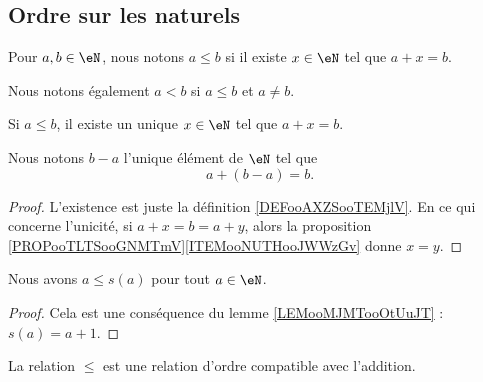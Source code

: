 \subsection{Ordre sur les naturels}
\label{SUBooOrdreNaturels}

\begin{definition}     \label{DEFooAXZSooTEMjlV}
	Pour \( a,b\in \eN\), nous notons \( a\leq b\) si il existe \( x\in \eN\) tel que \( a+x=b\).

	Nous notons également \( a<b \) si \( a\leq b\) et \( a\neq b\).
\end{definition}

\begin{propositionDef}	\label{LEMooVOTAooALatDu}
	Si \( a\leq b\), il existe un unique \( x\in \eN\) tel que \( a+x=b\).

	Nous notons \( b-a\) l'unique élément de \( \eN\) tel que
	\begin{equation}
		a+(b-a)=b.
	\end{equation}
\end{propositionDef}

\begin{proof}
	L'existence est juste la définition \ref{DEFooAXZSooTEMjlV}. En ce qui concerne l'unicité, si \( a+x=b=a+y\), alors la proposition \ref{PROPooTLTSooGNMTmV}\ref{ITEMooNUTHooJWWzGv} donne \( x=y\).
\end{proof}

\begin{lemma}       \label{LEMooWMYPooLTMyWb}
	Nous avons \( a\leq s(a)\) pour tout \( a\in \eN\).
\end{lemma}

\begin{proof}
	Cela est une conséquence du lemme \ref{LEMooMJMTooOtUuJT} : \( s(a)=a+1\).
\end{proof}

\begin{proposition}     \label{PROPooVXBBooZcghrA}
	La relation \( \leq\) est une relation d'ordre compatible avec l'addition.
\end{proposition}

